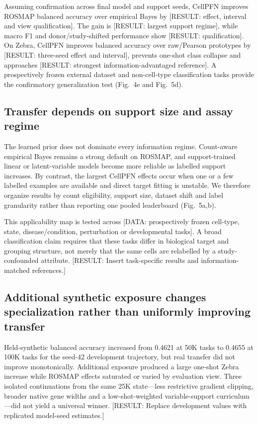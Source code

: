 \documentclass[12pt]{article}
\newcommand{\resultplaceholder}[1]{\textcolor{red!75!black}{[RESULT: #1]}}
\newcommand{\dataplaceholder}[1]{\textcolor{purple!70!black}{[DATA: #1]}}
\begin{document}
Assuming confirmation across final model and support seeds, CellPFN improves ROSMAP balanced accuracy over empirical Bayes by \resultplaceholder{effect, interval and view qualification}. The gain is \resultplaceholder{largest support regime}, while macro F1 and donor/study-shifted performance show \resultplaceholder{qualification}. On Zebra, CellPFN improves balanced accuracy over raw/Pearson prototypes by \resultplaceholder{three-seed effect and interval}, prevents one-shot class collapse and approaches \resultplaceholder{strongest information-advantaged reference}. A prospectively frozen external dataset and non-cell-type classification tasks provide the confirmatory generalization test (Fig.~4e and Fig.~5d).

\subsection*{Transfer depends on support size and assay regime}

The learned prior does not dominate every information regime. Count-aware empirical Bayes remains a strong default on ROSMAP, and support-trained linear or latent-variable models become more reliable as labelled support increases. By contrast, the largest CellPFN effects occur when one or a few labelled examples are available and direct target fitting is unstable. We therefore organize results by count eligibility, support size, dataset shift and label granularity rather than reporting one pooled leaderboard (Fig.~5a,b).

This applicability map is tested across \dataplaceholder{prospectively frozen cell-type, state, disease/condition, perturbation or developmental tasks}. A broad classification claim requires that these tasks differ in biological target and grouping structure, not merely that the same cells are relabelled by a study-confounded attribute. \resultplaceholder{Insert task-specific results and information-matched references.}

\subsection*{Additional synthetic exposure changes specialization rather than uniformly improving transfer}

Held-synthetic balanced accuracy increased from 0.4621 at 50K tasks to 0.4655 at 100K tasks for the seed-42 development trajectory, but real transfer did not improve monotonically. Additional exposure produced a large one-shot Zebra increase while ROSMAP effects saturated or varied by evaluation view. Three isolated continuations from the same 25K state---less restrictive gradient clipping, broader native gene widths and a low-shot-weighted variable-support curriculum---did not yield a universal winner. \resultplaceholder{Replace development values with replicated model-seed estimates.}
\end{document}
